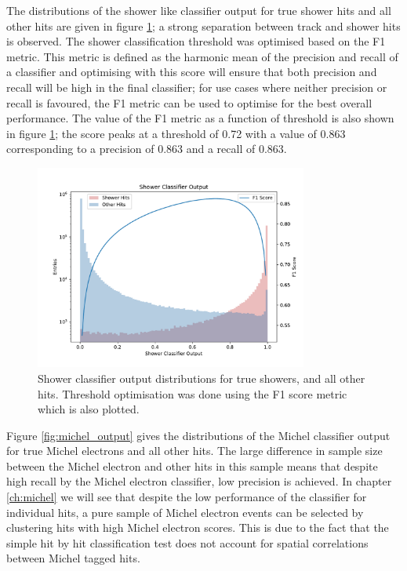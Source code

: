 The distributions of the shower like classifier output for true shower hits and
all other hits are given in figure \ref{fig:show_output}; a strong separation
between track and shower hits is observed. The shower classification threshold
was optimised based on the F1 metric. This metric is defined as the harmonic
mean of the precision and recall of a classifier and optimising with this score
will ensure that both precision and recall will be high in the final classifier;
for use cases where neither precision or recall is favoured, the F1 metric can
be used to optimise for the best overall performance. The value of the F1 metric
as a function of threshold is also shown in figure \ref{fig:show_output}; the
score peaks at a threshold of 0.72 with a value of 0.863 corresponding to a
precision of 0.863 and a recall of 0.863.  

\begin{figure}[h]
	\centering
	\includegraphics[width=0.8\textwidth]{figures/shower_combined.pdf} 
	\caption[Shower classifier output distributions.]{Shower classifier output
	distributions for true showers, and all other hits. Threshold optimisation
	was
	done using the F1 score metric which is also plotted.}
	\label{fig:show_output}
\end{figure}

Figure \ref{fig:michel_output} gives the distributions of the Michel classifier
output for true Michel electrons and all other hits. The large difference in
sample size between the Michel electron and other hits in this sample means that
despite high recall by the Michel electron classifier, low precision is
achieved. In chapter \ref{ch:michel} we will see that despite the low
performance of the classifier for individual hits, a pure sample of Michel
electron events can be selected by clustering hits with high Michel electron
scores. This is due to the fact that the simple hit by hit classification test
does not account for spatial correlations between Michel tagged hits.

